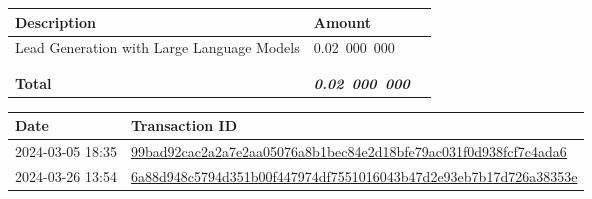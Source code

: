 \documentclass{article}
\def\bitcoin{%
  \leavevmode
  \vtop{\offinterlineskip %
    \setbox0=\hbox{B}%
    \setbox2=\hbox to\wd0{\hfil\hskip-.03em
    \vrule height .3ex width .15ex\hskip .08em
    \vrule height .3ex width .15ex\hfil}
    \vbox{\copy2\box0}\box2}}
\begin{document}
    \begin{table}[h]
        \centering
        \begin{tabular}{@{}lll@{}}
            \toprule
            \textbf{Description} & \textbf{Amount} \\ \midrule
            Lead Generation with Large Language Models & 0.02~000~000\\
            \\ \midrule
            \\
            \textbf{Total} & \textit{\textbf{\bitcoin{}0.02~000~000}} \\
            \bottomrule
        \end{tabular}
    \end{table}
    \begin{table}[h]
        \centering
        \begin{tabular}{@{}ll@{}}
            \toprule
            \textbf{Date} & \textbf{Transaction ID} \\ \midrule
            2024-03-05 18:35 & \href{https://mempool.space/tx/99bad92cac2a2a7e2aa05076a8b1bec84e2d18bfe79ac031f0d938fcf7c4ada6}{99bad92cac2a2a7e2aa05076a8b1bec84e2d18bfe79ac031f0d938fcf7c4ada6} \\
            2024-03-26 13:54 & \href{https://mempool.space/tx/6a88d948c5794d351b00f447974df7551016043b47d2e93eb7b17d726a38353e}{6a88d948c5794d351b00f447974df7551016043b47d2e93eb7b17d726a38353e} \\
            \bottomrule
        \end{tabular}
    \end{table}
\end{document}
